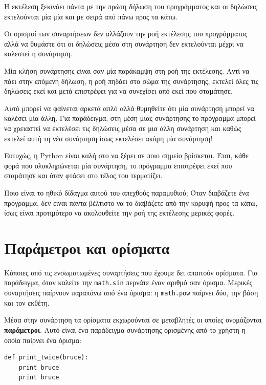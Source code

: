 \documentclass[10pt]{book}
\begin{document}
Η εκτέλεση ξεκινάει πάντα με την πρώτη δήλωση του προγράμματος και  
οι δηλώσεις εκτελούνται μία μία και με σειρά από πάνω προς τα κάτω.

Οι ορισμοί των συναρτήσεων δεν αλλάζουν την ροή εκτέλεσης του
προγράμματος αλλά να θυμάστε ότι οι δηλώσεις μέσα στη συνάρτηση
δεν εκτελούνται μέχρι να καλεστεί η συνάρτηση.

Μία κλήση συνάρτησης είναι σαν μία παράκαμψη στη ροή της εκτέλεσης.
Αντί να πάει στην επόμενη δήλωση, η ροή πηδάει στο σώμα της συνάρτησης,
εκτελεί όλες τις δηλώσεις εκεί και μετά επιστρέφει για να συνεχίσει από
εκεί που σταμάτησε.

Αυτό μπορεί να φαίνεται αρκετά απλό αλλά θυμηθείτε ότι μία συνάρτηση μπορεί
να καλέσει μία άλλη. Για παράδειγμα, στη μέση μιας συνάρτησης το πρόγραμμα μπορεί να χρειαστεί να εκτελέσει τις δηλώσεις μέσα σε μια άλλη συνάρτηση και καθώς εκτελεί αυτή τη νέα συνάρτηση ίσως εκτελέσει ακόμη μία συνάρτηση!


Ευτυχώς, η Python είναι καλή στο να ξέρει σε ποιο σημείο βρίσκεται.
Έτσι, κάθε φορά που ολοκληρώνεται μία συνάρτηση, το πρόγραμμα επιστρέφει
εκεί που σταμάτησε και όταν φτάσει στο τέλος του τερματίζει.

Ποιο είναι το ηθικό δίδαγμα αυτού του απεχθούς παραμυθιού; Όταν
διαβάζετε ένα πρόγραμμα, δεν είναι πάντα βέλτιστο να το διαβάζετε από την κορυφή προς τα κάτω, ίσως είναι προτιμότερο να ακολουθείτε την ροή της εκτέλεσης μερικές φορές.


\section{Παράμετροι και ορίσματα}
\label{parameters}

Κάποιες από τις ενσωματωμένες συναρτήσεις που έχουμε δει απαιτούν
ορίσματα. Για παράδειγμα, όταν καλείτε την  {\tt math.sin} 
περνάτε έναν αριθμό σαν όρισμα. Μερικές συναρτήσεις παίρνουν παραπάνω
από ένα όρισμα: η  {\tt math.pow}  παίρνει δύο, την βάση και
τον εκθέτη.

Μέσα στην συνάρτηση τα ορίσματα εκχωρούνται σε μεταβλητές οι οποίες
ονομάζονται {\bf παράμετροι}. Αυτό είναι ένα παράδειγμα συνάρτησης ορισμένης από το χρήστη η οποία παίρνει ένα όρισμα:

\begin{verbatim}
def print_twice(bruce):
    print bruce
    print bruce
\end{verbatim}
%
\end{document}
